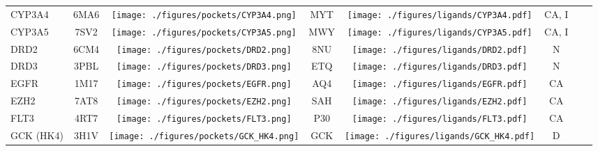 \begin{ThreePartTable}
\begin{longtable}{l @{\extracolsep{\fill}} *{7}{c}}
CYP3A4                                & 6MA6            &      \texttt{[image: ./figures/pockets/CYP3A4.png]}                     & MYT                    &\texttt{[image: ./figures/ligands/CYP3A4.pdf]}                                               & CA, I                          \\
CYP3A5                                & 7SV2            &      \texttt{[image: ./figures/pockets/CYP3A5.png]}                     & MWY                    &\texttt{[image: ./figures/ligands/CYP3A5.pdf]}                                               & CA, I                          \\
DRD2                                  & 6CM4            &      \texttt{[image: ./figures/pockets/DRD2.png]}                     & 8NU                    &\texttt{[image: ./figures/ligands/DRD2.pdf]}                                               & N                             \\
DRD3                                  & 3PBL            &       \texttt{[image: ./figures/pockets/DRD3.png]}                    & ETQ                    &\texttt{[image: ./figures/ligands/DRD3.pdf]}                                              & N                             \\
EGFR                                  & 1M17            &       \texttt{[image: ./figures/pockets/EGFR.png]}                    & AQ4                    &\texttt{[image: ./figures/ligands/EGFR.pdf]}                                              & CA                                              \\
EZH2                                  & 7AT8            &        \texttt{[image: ./figures/pockets/EZH2.png]}                   & SAH                    &\texttt{[image: ./figures/ligands/EZH2.pdf]}                                             & CA                                              \\
FLT3                                  & 4RT7            &          \texttt{[image: ./figures/pockets/FLT3.png]}                 & P30                    &\texttt{[image: ./figures/ligands/FLT3.pdf]}                                           & CA                                              \\
GCK (HK4)                             & 3H1V            &      \texttt{[image: ./figures/pockets/GCK\_HK4.png]}                     & GCK                    &\texttt{[image: ./figures/ligands/GCK\_HK4.pdf]}                                               & D                                            \\

\end{longtable}
\end{ThreePartTable}
